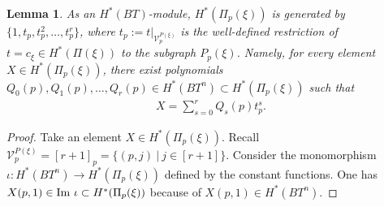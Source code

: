 \documentclass[12pt]{amsart}
\newtheorem{lemma}[theorem]{Lemma}
\theoremstyle{definition}
\theoremstyle{remark}
\numberwithin{equation}{section}
\begin{document}
\begin{lemma}
\label{technical_lemm}
As an $H^{*}(BT)$-module, $H^{*}(\Pi_{p}(\xi))$ is generated by $\{1, t_{p},t_{p}^{2},\ldots, t_{p}^{r}\}$, where  $t_{p}:=t|_{\mathcal{V}_{p}^{P(\xi)}}$ is the well-defined restriction of $t=c_{\xi}\in H^{*}(\Pi(\xi))$ to the subgraph $P_{p}(\xi)$.
Namely, for every element $X\in H^{*}(\Pi_{p}(\xi))$, there exist polynomials $Q_{0}(p),Q_{1}(p),\ldots, Q_{r}(p)\in H^{*}(BT^{n})\subset H^{*}(\Pi_{p}(\xi))$ such that
\begin{align}\label{eq:module_dec}
X=\sum_{s=0}^{r}Q_{s}(p)t_{p}^{s}.
\end{align}
\end{lemma}
\begin{proof}
Take an element $X\in H^{*}(\Pi_{p}(\xi))$.
Recall $\mathcal{V}_{p}^{P(\xi)}=[r+1]_{p}=\{(p,j)\ |\ j\in [r+1]\}$.
Consider the monomorphism $\iota\colon H^{*}(BT^{n})\to H^{*}(\Pi_{p}(\xi))$ defined by the constant functions.
One has  $X(p,1)\in {\rm Im}~\iota\subset H^{*}(\Pi_{p}(\xi))$ because of $X(p,1)\in H^{*}(BT^{n})$.


\end{proof}
\end{document}
